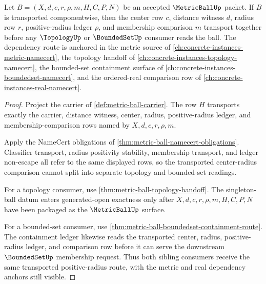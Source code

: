 \begin{theorem}
\label{thm:metric-ball-positive-radius-transport}
Let $B=(X,d,c,r,\rho,m,H,C,P,N)$ be an accepted $\MetricBallUp$ packet. If $B$ is transported componentwise, then the center row $c$, distance witness $d$, radius row $r$, positive-radius ledger $\rho$, and membership comparison $m$ transport together before any $\TopologyUp$ or $\BoundedSetUp$ consumer reads the ball. The dependency route is anchored in the metric source of \autoref{ch:concrete-instances-metric-namecert}, the topology handoff of \autoref{ch:concrete-instances-topology-namecert}, the bounded-set containment surface of \autoref{ch:concrete-instances-boundedset-namecert}, and the ordered-real comparison row of \autoref{ch:concrete-instances-real-namecert}.
\end{theorem}
\begin{proof}
Project the carrier of \autoref{def:metric-ball-carrier}. The row $H$ transports exactly the carrier, distance witness, center, radius, positive-radius ledger, and membership-comparison rows named by $X,d,c,r,\rho,m$.

Apply the NameCert obligations of \autoref{thm:metric-ball-namecert-obligations}. Classifier transport, radius positivity stability, membership transport, and ledger non-escape all refer to the same displayed rows, so the transported center-radius comparison cannot split into separate topology and bounded-set readings.

For a topology consumer, use \autoref{thm:metric-ball-topology-handoff}. The singleton-ball datum enters generated-open exactness only after $X,d,c,r,\rho,m,H,C,P,N$ have been packaged as the $\MetricBallUp$ surface.

For a bounded-set consumer, use \autoref{thm:metric-ball-boundedset-containment-route}. The containment ledger likewise reads the transported center, radius, positive-radius ledger, and comparison row before it can serve the downstream $\BoundedSetUp$ membership request. Thus both sibling consumers receive the same transported positive-radius route, with the metric and real dependency anchors still visible.
\end{proof}

